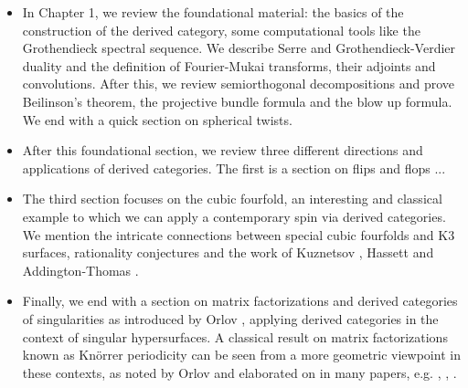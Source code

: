 \begin{itemize}
    \item In Chapter 1, we review the foundational material: the basics of the construction of the derived category, some computational tools like the Grothendieck spectral sequence. We describe Serre and Grothendieck-Verdier duality and the definition of Fourier-Mukai transforms, their adjoints and convolutions. After this, we review semiorthogonal decompositions and prove Beilinson's theorem, the projective bundle formula and the blow up formula. We end with a quick section on spherical twists.
    \item After this foundational section, we review three different directions and applications of derived categories. The first is a section on flips and flops ... 
    \item The third section focuses on the cubic fourfold, an interesting and classical example to which we can apply a contemporary spin via derived categories. We mention the intricate connections between special cubic fourfolds and K3 surfaces, rationality conjectures and the work of Kuznetsov \cite{KuznetsovDerivedCubic}, Hassett \cite{hassett_special_2000} and Addington-Thomas \cite{addington_hodge_2014}. 
    \item Finally, we end with a section on matrix factorizations and derived categories of singularities as introduced by Orlov \cite{OrlovSingularities}, applying derived categories in the context of singular hypersurfaces. A classical result on matrix factorizations known as Kn\"orrer periodicity can be seen from a more geometric viewpoint in these contexts, as noted by Orlov and elaborated on in many papers, e.g. \cite{OrlovKnorrer}, \cite{Shipman}, \cite{Hirano}.
\end{itemize}
